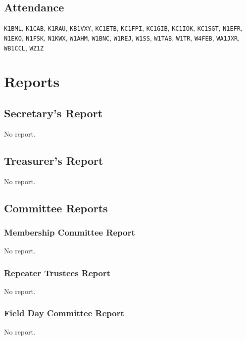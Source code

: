 \documentclass[10pt,letterpaper]{article}
\begin{document}
\subsection{Attendance}

\texttt{K1BML},
\texttt{K1CAB},
\texttt{K1RAU},
\texttt{KB1VXY},
\texttt{KC1ETB},
\texttt{KC1FPI},
\texttt{KC1GIB},
\texttt{KC1IOK},
\texttt{KC1SGT},
\texttt{N1EFR},
\texttt{N1EKO},
\texttt{N1FSK},
\texttt{N1KWX},
\texttt{W1AHM},
\texttt{W1BNC},
\texttt{W1REJ},
\texttt{W1SS},
\texttt{W1TAB},
\texttt{W1TR},
\texttt{W4FEB},
\texttt{WA1JXR},
\texttt{WB1CCL},
\texttt{WZ1Z}



\section{Reports}

\subsection{Secretary's Report}
No report.

\newpage
\subsection{Treasurer's Report}
No report.

\subsection{Committee Reports}

\subsubsection{Membership Committee Report}
No report.

\subsubsection{Repeater Trustees Report}
No report.

\subsubsection{Field Day Committee Report}
No report.
\end{document}
